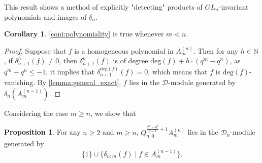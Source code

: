 \documentclass[12pt,a4paper]{report}
\theoremstyle{definition}
\newtheorem{proposition}[theorem]{Proposition}
\newtheorem{corollary}{Corollary}[theorem]
\theoremstyle{remark}
\theoremstyle{definition}
\begin{document}
This result shows a method of explicitly "detecting" products of $GL_n$-invariant polynomials and images of $\delta_n$. 
\begin{corollary}\label{cor:weak_version_m_less_than_n}
\cref{conj:polynomiality} is true whenever $m< n$.
\end{corollary}
\begin{proof}
    Suppose that $f$ is a homogeneous polynomial in $A_m^{(n)}$. Then for any $h\in \mathbb{N}$, if $\delta_{n+1}^h(f)\neq 0$, then $\delta_{n+1}^h(f)$ is of degree $\mathrm{deg}(f) + h\cdot(q^m - q^n)$, as $q^m - q^n \le -1$, it implies that $\delta_{n+1}^{\mathrm{deg}(f)}(f) = 0$, which means that $f$ is $\mathrm{deg}(f)$-vanishing. By \cref{lemma:general_exact}, $f$ lies in the $\mathcal{D}$-module generated by $\delta_n(A_{m}^{(n-1)})$.    
\end{proof}
Considering the case $m\geq n$, we show that
\begin{proposition}
    \label{prop:weakened_version}
For any $n\geq 2$ and $m\geq n$, $Q_{n, 0}^{\frac{q^m-q^n}{q-1}+1}A_{m}^{(n)}$ lies in the $\mathcal{D}_n$-module generated by 
\begin{equation*}
    \{1\}\cup \{\delta_{n;m}(f)\mid f\in A_{m}^{(n-1)}\}. 
\end{equation*}
\end{proposition}
\end{document}
